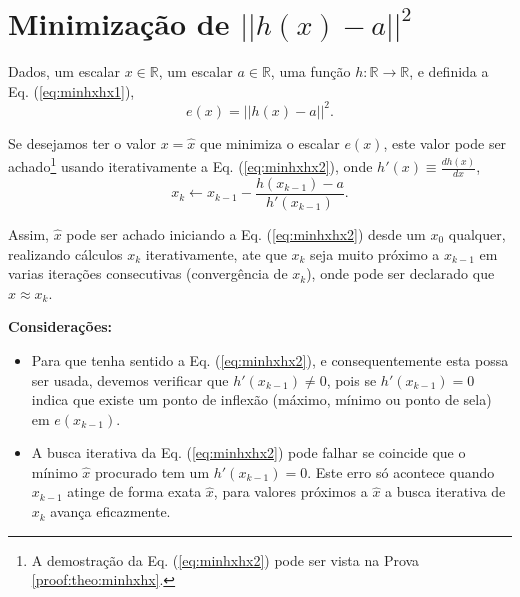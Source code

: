 \section{Minimização de $||h(x)-a||^2$} 




\begin{theorem}\label{theo:minhxhx}
Dados,
um escalar $x \in \mathbb{R}$, 
um escalar $a \in \mathbb{R}$,  
uma função $h:\mathbb{R} \rightarrow \mathbb{R}$, e 
definida a Eq. (\ref{eq:minhxhx1}),
\begin{equation}\label{eq:minhxhx1}
e(x)=||h(x)-a||^2.
\end{equation}

Se desejamos ter o valor $x=\hat{x}$ que minimiza o escalar $e(x)$,
este valor pode ser achado\footnote{A 
demostração da Eq. (\ref{eq:minhxhx2}) pode ser vista na Prova \ref{proof:theo:minhxhx}.} 
usando iterativamente a Eq. (\ref{eq:minhxhx2}),
onde  $h'(x)\equiv \frac{d h(x)}{d x}$,
\begin{equation}\label{eq:minhxhx2}
x_{k} \leftarrow x_{k-1}-
\frac{ h(x_{k-1})-a}{h'(x_{k-1})}.
\end{equation}


Assim, $\hat{x}$ pode ser achado iniciando a Eq. (\ref{eq:minhxhx2}) desde um 
$x_{0}$ qualquer, realizando cálculos $x_{k}$ iterativamente, 
ate que $x_{k}$ seja muito próximo a $x_{k-1}$ em varias iterações consecutivas (convergência de $x_{k}$),
onde pode ser declarado que $\hat{x} \approx x_{k}$.

\textbf{Considerações:}
\begin{itemize} 
\item Para que tenha sentido a Eq. (\ref{eq:minhxhx2}),
 e consequentemente esta possa ser usada, devemos verificar que  $h'(x_{k-1})\neq 0$,
pois se $h'(x_{k-1})= 0$ indica que existe um ponto de inflexão 
(máximo, mínimo ou ponto de sela) em $e(x_{k-1})$.
\item A busca iterativa da Eq. (\ref{eq:minhxhx2}) pode falhar se coincide que o mínimo $\hat{x}$ procurado
tem um $h'(x_{k-1})= 0$.
Este erro só acontece quando $x_{k-1}$ atinge de forma exata $\hat{x}$,
para valores próximos a $\hat{x}$ a busca iterativa de $x_{k}$ avança eficazmente.
\end{itemize}
\end{theorem}


